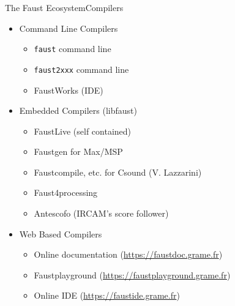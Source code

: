 
\begin{frame}{The Faust Ecosystem}{Compilers}
	
\begin{itemize}
\item Command Line Compilers
	\begin{itemize}
	\item \lstinline'faust' command line
	\item \lstinline'faust2xxx' command line
	\item FaustWorks (IDE)
	\end{itemize}
\item Embedded Compilers (libfaust)
	\begin{itemize}
	\item FaustLive (self contained)
	\item Faustgen for Max/MSP
	\item Faustcompile, etc. for Csound (V. Lazzarini)
	\item Faust4processing
	\item Antescofo (IRCAM's score follower)
	\end{itemize}
\item Web Based Compilers
	\begin{itemize}
	\item Online documentation (\url{https://faustdoc.grame.fr})
	\item Faustplayground (\url{https://faustplayground.grame.fr})
	\item Online IDE (\url{https://faustide.grame.fr})
	\end{itemize}

\end{itemize}
\end{frame}

